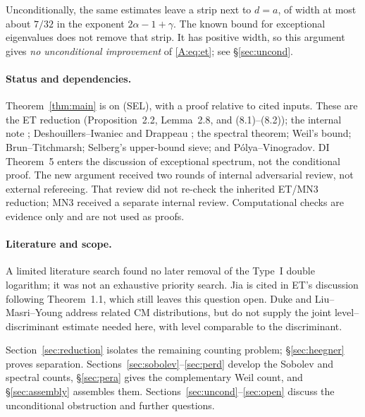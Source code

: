 Unconditionally, the same estimates leave a strip next to $d=a$, of width
at most about $7/32$ in the exponent $2\alpha-1+\gamma$.
The known bound for exceptional eigenvalues does not remove that strip.
It has positive width, so this argument gives \emph{no unconditional
improvement} of \eqref{A:eq:et}; see \S\ref{sec:uncond}.

\paragraph{Status and dependencies.}
Theorem~\ref{thm:main} is  on (SEL), with a proof relative
to cited inputs. These are the ET reduction (Proposition~2.2, Lemma~2.8,
and (8.1)--(8.2)); the internal note \cite[Proposition~2.3 and
Theorem~3.8(1)]{MN3}; Deshouillers--Iwaniec \cite[Theorem~2]{DI} and
Drappeau \cite[Proposition~4.7, arXiv numbering]{Dr}; the spectral theorem;
Weil's bound; Brun--Titchmarsh; Selberg's upper-bound sieve; and
P\'olya--Vinogradov. DI Theorem~5 enters the discussion of exceptional
spectrum, not the conditional proof. The new argument received two rounds
of internal adversarial review, not external refereeing. That review did
not re-check the inherited ET/MN3 reduction; MN3 received a separate internal
review. Computational checks are evidence only and are not used as proofs.

\paragraph{Literature and scope.}
A limited literature search found no later removal of the Type~I double
logarithm; it was not an exhaustive priority search. Jia \cite{Jia} is cited
in ET's discussion following Theorem~1.1, which still leaves this question
open. Duke \cite{Duke} and Liu--Masri--Young \cite{LMY} address related CM
distributions, but do not supply the joint level--discriminant estimate
needed here, with level comparable to the discriminant.

Section~\ref{sec:reduction} isolates the remaining counting problem;
\S\ref{sec:heegner} proves separation. Sections~\ref{sec:sobolev}--\ref{sec:perd}
develop the Sobolev and spectral counts, \S\ref{sec:pera} gives the
complementary Weil count, and \S\ref{sec:assembly} assembles them.
Sections~\ref{sec:uncond}--\ref{sec:open} discuss the unconditional obstruction
and further questions.

